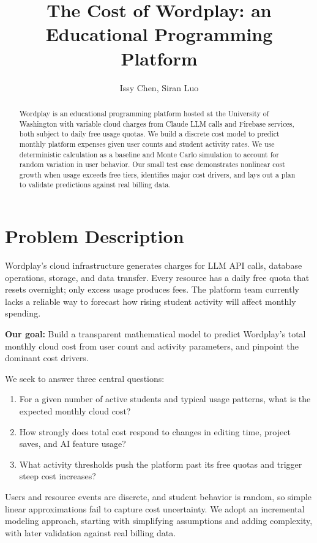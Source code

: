 \documentclass{article}
\title{The Cost of Wordplay: an Educational Programming Platform}
\author{Issy Chen, Siran Luo}
\date{}
\begin{document}
\maketitle

\begin{abstract}
Wordplay is an educational programming platform hosted at the University of Washington with variable cloud charges from Claude LLM calls and Firebase services, both subject to daily free usage quotas. We build a discrete cost model to predict monthly platform expenses given user counts and student activity rates. We use deterministic calculation as a baseline and Monte Carlo simulation to account for random variation in user behavior. Our small test case demonstrates nonlinear cost growth when usage exceeds free tiers, identifies major cost drivers, and lays out a plan to validate predictions against real billing data.
\end{abstract}

\section{Problem Description}
Wordplay’s cloud infrastructure generates charges for LLM API calls, database operations, storage, and data transfer. Every resource has a daily free quota that resets overnight; only excess usage produces fees. The platform team currently lacks a reliable way to forecast how rising student activity will affect monthly spending.

\noindent \textbf{Our goal:} Build a transparent mathematical model to predict Wordplay’s total monthly cloud cost from user count and activity parameters, and pinpoint the dominant cost drivers.

We seek to answer three central questions:
\begin{enumerate}
    \item For a given number of active students and typical usage patterns, what is the expected monthly cloud cost?
    \item How strongly does total cost respond to changes in editing time, project saves, and AI feature usage?
    \item What activity thresholds push the platform past its free quotas and trigger steep cost increases?
\end{enumerate}

Users and resource events are discrete, and student behavior is random, so simple linear approximations fail to capture cost uncertainty. We adopt an incremental modeling approach, starting with simplifying assumptions and adding complexity, with later validation against real billing data.
\end{document}
